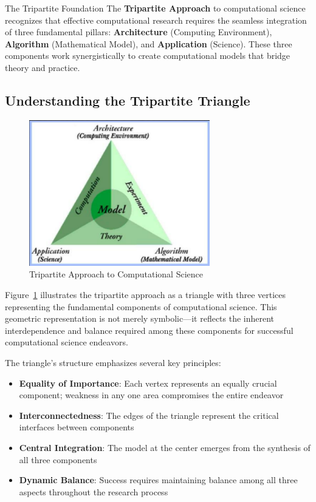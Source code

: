 \begin{conceptcard}{The Tripartite Foundation}
The \textbf{Tripartite Approach} to computational science recognizes that effective computational research requires the seamless integration of three fundamental pillars: \textbf{Architecture} (Computing Environment), \textbf{Algorithm} (Mathematical Model), and \textbf{Application} (Science). These three components work synergistically to create computational models that bridge theory and practice.
\end{conceptcard}

\subsection{Understanding the Tripartite Triangle}

\begin{figure}[h]
 \centering
 \includegraphics[width=0.7\textwidth]{images/tripartite_triangle.png}
 \caption{Tripartite Approach to Computational Science}
 \label{fig:tripartite_approach}
\end{figure}

Figure~\ref{fig:tripartite_approach} illustrates the tripartite approach as a triangle with three vertices representing the fundamental components of computational science. This geometric representation is not merely symbolic—it reflects the inherent interdependence and balance required among these components for successful computational science endeavors.

The triangle's structure emphasizes several key principles:

\begin{itemize}
    \item \textbf{Equality of Importance}: Each vertex represents an equally crucial component; weakness in any one area compromises the entire endeavor
    \item \textbf{Interconnectedness}: The edges of the triangle represent the critical interfaces between components
    \item \textbf{Central Integration}: The model at the center emerges from the synthesis of all three components
    \item \textbf{Dynamic Balance}: Success requires maintaining balance among all three aspects throughout the research process
\end{itemize}

